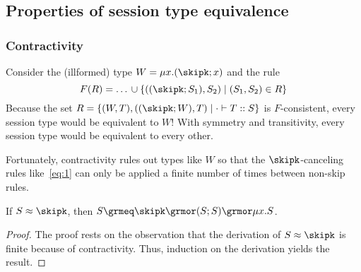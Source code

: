 \newpage
\subsection{Properties of session type equivalence}

\subsubsection{Contractivity}
\label{sec:contractivity}


Consider the (illformed) type $W = \mu x.(\skipk; x)$ and the rule
\begin{equation}
  F(R) = \dots {}\cup{} \{ ((\skipk;S_1), S_2) \mid (S_1, S_2) \in R \}\label{eq:1}
\end{equation}
Because the set $R = \{(W,T), ((\skipk; W), T) \mid \cdot \vdash T :: S\}$ is $F$-consistent, every session type would
be equivalent to $W$! With symmetry and transitivity, every session type would be equivalent to
every other.

Fortunately, contractivity rules out types like $W$ so that the $\skipk$-canceling rules like~\eqref{eq:1} can only be
applied a finite number of times between non-skip rules.

\begin{lemma}\label{lemma:S=skip}
  If $S \approx \skipk$, then $S \grmeq \skipk \grmor (S; S) \grmor
  \mu x.S$.
\end{lemma}
\begin{proof}
  The proof rests on the observation that the derivation of $S \approx
  \skipk$ is finite because of contractivity. Thus, induction on the
  derivation yields the result.
\end{proof}


